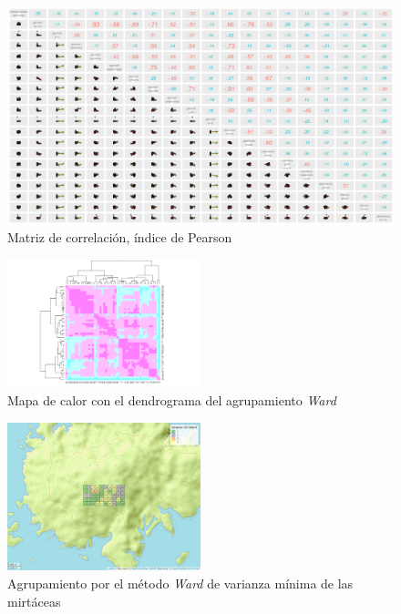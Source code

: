 \documentclass[11pt,]{article}
\begin{document}
\begin{figure}
\centering
\includegraphics{matriz_correlacion_geomorf_abun_riq_spearman.png}
\caption{Matriz de correlación, índice de Pearson
\label{fig:matriz_pearson}}
\end{figure}

\begin{figure}
\centering
\includegraphics[width=0.50000\textwidth]{Mapadecalor_Ward_aa2.png}
\caption{Mapa de calor con el dendrograma del agrupamiento \emph{Ward}
\label{fig:mapadecalor_ward}}
\end{figure}

\begin{figure}
\centering
\includegraphics[width=0.50000\textwidth]{mapa_ward_k4.png}
\caption{Agrupamiento por el método \emph{Ward} de varianza mínima de
las mirtáceas \label{fig:mapa_ward}}
\end{figure}
\end{document}

